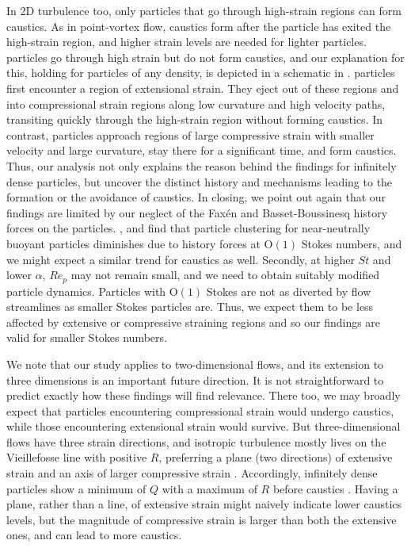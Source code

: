 \documentclass[../Rajarshi-thesis-draft.tex]{subfiles}
\begin{document}
In 2D turbulence too, only particles that go through high-strain regions can form caustics. As in point-vortex flow, caustics form after the particle has exited the high-strain region, and higher strain levels are needed for lighter particles. \su particles go through high strain but do not form caustics, and our explanation for this, holding for particles of any density, is depicted in a schematic in . \su particles first encounter a region of extensional strain. They eject out of these regions and into compressional strain regions along low curvature and high velocity paths, transiting quickly through the high-strain region without forming caustics. In contrast, \cs particles approach regions of large compressive strain with smaller velocity and large curvature, stay there for a significant time, and form caustics. Thus, our analysis not only explains the reason behind the \citet{batge2023} findings for infinitely dense particles, but uncover the distinct history and mechanisms leading to the formation or the avoidance of caustics.
In closing, we point out again that our findings are limited by our neglect of the Fax\'en and Basset-Boussinesq history forces on the particles. \citet{olivieri2014}, and \citet{daitche2015} find that particle clustering for near-neutrally buoyant particles diminishes due to history forces at O$(1)$ Stokes numbers, and we might expect a similar trend for caustics as well. Secondly, at higher $St$ and lower $\alpha$, $Re_p$ may not remain small, and we need to obtain suitably modified particle dynamics. {Particles with $\text{O}(1)$ Stokes are not as diverted by flow streamlines as smaller Stokes particles are. Thus, we expect them to be less affected by extensive or compressive straining regions and so our findings are valid for smaller Stokes numbers. }

{We note that our study applies to two-dimensional flows, and its extension to three dimensions is an important future direction. It is not straightforward to predict exactly how these findings will find relevance. There too, we may broadly expect that particles encountering compressional strain would undergo caustics, while those encountering extensional strain would survive. But three-dimensional flows have three strain directions, and isotropic turbulence mostly lives on the Vieillefosse line with positive $R$, preferring a plane (two directions) of extensive strain and an axis of larger compressive strain \cite{ashurst1987,meneveau2011}. Accordingly, infinitely dense particles show a minimum of $Q$ with a maximum of $R$ before caustics \cite{zhang2025}. Having a plane, rather than a line, of extensive strain might naively indicate lower caustics levels, but the magnitude of compressive strain is larger than both the extensive ones, and can lead to more caustics. }
\end{document}
